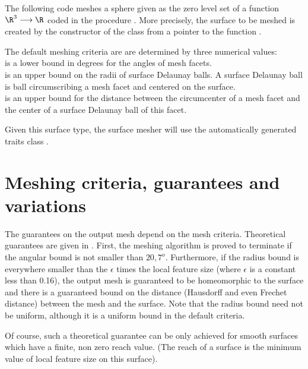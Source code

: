 The following code meshes a sphere 
given as the zero level set of a function $\R^3 \longrightarrow \R$
coded in the procedure .
More precisely, 
the surface to be meshed is created 
by the constructor
of the class 
from a pointer to the function .

The default meshing criteria are  are determined  by three numerical
values: \\ 
 is a lower bound in degrees for the angles 
     of mesh facets.\\
 is an upper bound on the radii of surface Delaunay
balls. A surface Delaunay ball is ball circumscribing a mesh facet
and centered on the surface. \\
 is an upper bound for the distance 
between the circumcenter of a mesh facet and the center of a surface
Delaunay ball of this facet.

Given this surface type, the surface mesher will use
the automatically generated traits class
.


\section{Meshing criteria, guarantees and variations}
\label{SurfaceMesher_section_criteria}
\label{SurfaceMesher_section_variations}

The guarantees on the output mesh depend on the mesh criteria.
Theoretical guarantees are given in \cite{cgal:sry-mvbss-05}.
First, the meshing algorithm is proved to terminate 
if the angular bound is
not smaller than $20,7^o$. 
Furthermore, if the radius bound is everywhere smaller than 
the $\epsilon$ times the local feature size  
(where $\epsilon$ is a constant
less than 0.16),  the output mesh 
is guaranteed to be homeomorphic to the surface
and  there is a guaranteed bound 
on the  distance (Hausdorff and even Frechet distance)
between the mesh and the surface.
Note that the radius bound need not be uniform,
although it is a uniform bound in the default criteria.

Of course, such a theoretical guarantee can be only achieved
for smooth surfaces which have a finite, non zero
reach value. (The reach of a surface is the minimum value 
of local feature size on
this surface).

